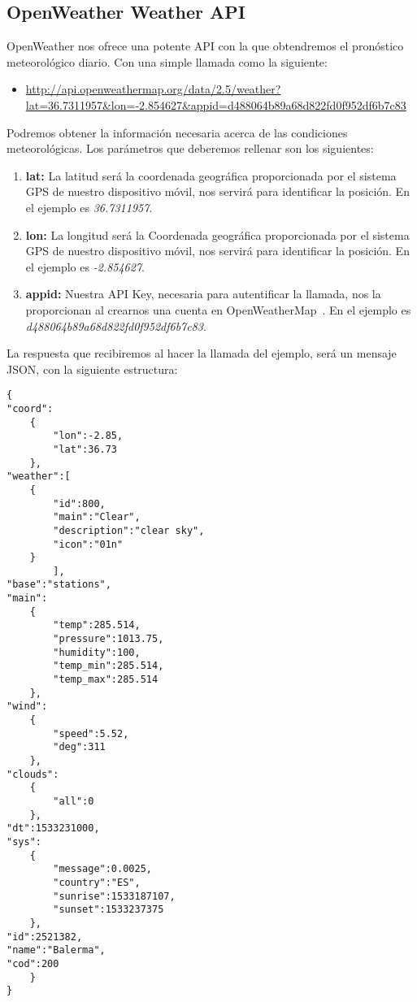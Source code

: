 \subsection{OpenWeather Weather API}

OpenWeather nos ofrece una potente API con la que obtendremos
 el pronóstico meteorológico diario. Con una simple llamada como la 
siguiente:
\begin{itemize}


\item  \url{http://api.openweathermap.org/data/2.5/weather?lat=36.7311957&lon=-2.854627&appid=d488064b89a68d822fd0f952df6b7c83}
\end{itemize}
Podremos obtener la información necesaria acerca de las condiciones meteorológicas.
 Los parámetros que deberemos rellenar son los siguientes:

\begin{enumerate}
\item \textbf{lat:} La latitud será la coordenada geográfica proporcionada 
por el sistema GPS de nuestro dispositivo móvil, nos servirá para identificar
 la posición. En el ejemplo es \emph{36.7311957}.
\item \textbf{lon:} La longitud será la Coordenada geográfica 
proporcionada por el sistema GPS de nuestro dispositivo móvil, 
nos servirá para identificar la posición. En el ejemplo es \emph{-2.854627}.
\item \textbf{appid:} Nuestra API Key, necesaria para autentificar
 la llamada, nos la proporcionan al crearnos una cuenta en 
OpenWeatherMap~\cite{OPENWEATHER}. 
En el ejemplo es \emph{d488064b89a68d822fd0f952df6b7c83}.
\end{enumerate}

La respuesta que recibiremos al hacer la llamada del ejemplo,
 será un mensaje JSON, con la siguiente estructura:
\\
\begin{lstlisting}
{
"coord":
	{
		"lon":-2.85,
		"lat":36.73
	},
"weather":[
	{
		"id":800,
		"main":"Clear",
		"description":"clear sky",
		"icon":"01n"
	}
		],
"base":"stations",
"main":
	{
		"temp":285.514,
		"pressure":1013.75,
		"humidity":100,
		"temp_min":285.514,
		"temp_max":285.514
	},
"wind":
	{
		"speed":5.52,
		"deg":311
	},
"clouds":
	{
		"all":0
	},
"dt":1533231000,
"sys":
	{
		"message":0.0025,
		"country":"ES",
		"sunrise":1533187107,
		"sunset":1533237375
	},
"id":2521382,
"name":"Balerma",
"cod":200
	}
}
\end{lstlisting}

